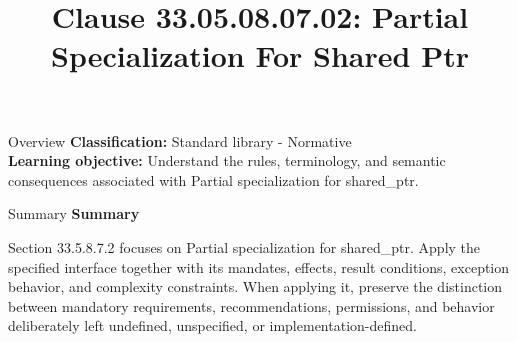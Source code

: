 \documentclass[10pt,letterpaper]{article}
\title{Clause 33.05.08.07.02: Partial Specialization For Shared Ptr}
\author{}
\date{}
\begin{document}
\maketitle
\begin{CornellOverviewBox}{Overview}
\textbf{Classification:} Standard library - Normative\\[2pt]
\textbf{Learning objective:} Understand the rules, terminology, and semantic consequences associated with Partial specialization for shared\_ptr.
\end{CornellOverviewBox}\begin{CornellSummaryBox}{Summary}
{\sffamily\bfseries\color{Accent} Summary}\par\vspace{3pt}Section 33.5.8.7.2 focuses on Partial specialization for shared\_ptr. Apply the specified interface together with its mandates, effects, result conditions, exception behavior, and complexity constraints. When applying it, preserve the distinction between mandatory requirements, recommendations, permissions, and behavior deliberately left undefined, unspecified, or implementation-defined.
\end{CornellSummaryBox}
\end{document}
